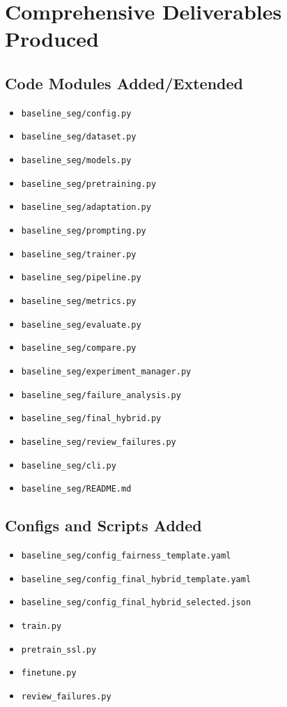 \documentclass[11pt,a4paper]{article}
\begin{document}
\section{Comprehensive Deliverables Produced}
\subsection{Code Modules Added/Extended}
\begin{itemize}[leftmargin=1.5em]
  \item \texttt{baseline\_seg/config.py}
  \item \texttt{baseline\_seg/dataset.py}
  \item \texttt{baseline\_seg/models.py}
  \item \texttt{baseline\_seg/pretraining.py}
  \item \texttt{baseline\_seg/adaptation.py}
  \item \texttt{baseline\_seg/prompting.py}
  \item \texttt{baseline\_seg/trainer.py}
  \item \texttt{baseline\_seg/pipeline.py}
  \item \texttt{baseline\_seg/metrics.py}
  \item \texttt{baseline\_seg/evaluate.py}
  \item \texttt{baseline\_seg/compare.py}
  \item \texttt{baseline\_seg/experiment\_manager.py}
  \item \texttt{baseline\_seg/failure\_analysis.py}
  \item \texttt{baseline\_seg/final\_hybrid.py}
  \item \texttt{baseline\_seg/review\_failures.py}
  \item \texttt{baseline\_seg/cli.py}
  \item \texttt{baseline\_seg/README.md}
\end{itemize}

\subsection{Configs and Scripts Added}
\begin{itemize}[leftmargin=1.5em]
  \item \texttt{baseline\_seg/config\_fairness\_template.yaml}
  \item \texttt{baseline\_seg/config\_final\_hybrid\_template.yaml}
  \item \texttt{baseline\_seg/config\_final\_hybrid\_selected.json}
  \item \texttt{train.py}
  \item \texttt{pretrain\_ssl.py}
  \item \texttt{finetune.py}
  \item \texttt{review\_failures.py}
\end{itemize}
\end{document}
